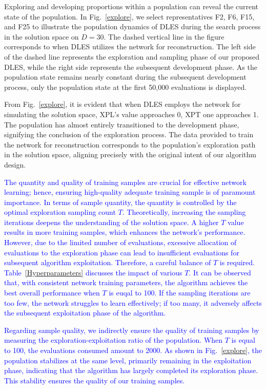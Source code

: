 \documentclass[journal,twoside]{IEEEtran}
\begin{document}
Exploring and developing proportions within a population can reveal the current state of the population. In Fig.~\ref{explore}, we select representatives F2, F6, F15, and F25 to illustrate the population dynamics of DLES during the search process in the solution space on $D=30$. The dashed vertical line in the figure corresponds to  when DLES utilizes the network for reconstruction. The left side of the dashed line represents the exploration and sampling phase of our proposed DLES, while the right side represents the subsequent development phase. As the population state remains nearly constant during the subsequent development process, only the population state at the first 50,000 evaluations is displayed.

From Fig.~\ref{explore}, it is evident that when DLES employs the network for simulating the solution space, XPL's value approaches 0, XPT one approaches 1. The population has almost entirely transitioned to the development phase, signifying the conclusion of the exploration process. The data provided to train the network for reconstruction corresponds to the population's exploration path in the solution space, aligning precisely with the original intent of our algorithm design.

\textcolor{blue}{
The quantity and quality of training samples are crucial for effective network learning; hence, ensuring high-quality adequate training sample is of paramount importance. In terms of sample quantity, the quantity is controlled by the optimal exploration sampling count $T$. Theoretically, increasing the sampling iterations deepens the understanding of the solution space. A higher $T$ value results in more training samples, which enhances the network's performance. However, due to the limited number of evaluations, excessive allocation of evaluations to the exploration phase can lead to insufficient evaluations for subsequent algorithm exploitation. Therefore, a careful balance of $T$ is required. Table~\ref{Hyperparameters} discusses the impact of various $T$. It can be observed that, with consistent network training parameters, the algorithm achieves the best overall performance when $T$ is euqal to 100. If the sampling iterations are too few, the network struggles to learn effectively; if too many, it adversely affects the subsequent exploitation phase of the algorithm.}

\textcolor{blue}{
Regarding sample quality, we indirectly ensure the quality of training samples by measuring the exploration-exploitation ratio of the population. When $T$ is equal to 100, the evaluations consumed amount to 2000. As shown in Fig.~\ref{explore}, the population stabilizes at the same level, primarily remaining in the exploitation phase, indicating that the algorithm has largely completed its exploration phase. This stability ensures the quality of our training samples.
}
\end{document}

